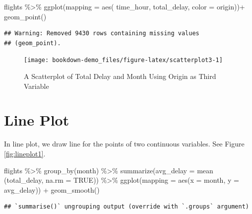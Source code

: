 \documentclass[
]{book}
\newenvironment{Shaded}{\begin{snugshade}}{\end{snugshade}}
\newcommand{\AttributeTok}[1]{\textcolor[rgb]{0.77,0.63,0.00}{#1}}
\newcommand{\ConstantTok}[1]{\textcolor[rgb]{0.00,0.00,0.00}{#1}}
\newcommand{\FunctionTok}[1]{\textcolor[rgb]{0.00,0.00,0.00}{#1}}
\newcommand{\NormalTok}[1]{#1}
\newcommand{\SpecialCharTok}[1]{\textcolor[rgb]{0.00,0.00,0.00}{#1}}
\begin{document}
\begin{Shaded}
\begin{Highlighting}[]
\NormalTok{flights }\SpecialCharTok{\%\textgreater{}\%} 
  \FunctionTok{ggplot}\NormalTok{(}\AttributeTok{mapping =} \FunctionTok{aes}\NormalTok{( time\_hour, total\_delay, }\AttributeTok{color =}\NormalTok{ origin))}\SpecialCharTok{+}
  \FunctionTok{geom\_point}\NormalTok{()}
\end{Highlighting}
\end{Shaded}

\begin{verbatim}
## Warning: Removed 9430 rows containing missing values
## (geom_point).
\end{verbatim}

\begin{figure}

{\centering \texttt{[image: bookdown-demo\_files/figure-latex/scatterplot3-1]} 

}

\caption{A Scatterplot of Total Delay and Month Using Origin as Third Variable}\label{fig:scatterplot3}
\end{figure}

\hypertarget{line-plot}{%
\section{Line Plot}\label{line-plot}}

In line plot, we draw line for the points of two continuous variables. See Figure \ref{fig:lineplot1}.

\begin{Shaded}
\begin{Highlighting}[]
\NormalTok{flights }\SpecialCharTok{\%\textgreater{}\%} 
  \FunctionTok{group\_by}\NormalTok{(month) }\SpecialCharTok{\%\textgreater{}\%} 
  \FunctionTok{summarize}\NormalTok{(}\AttributeTok{avg\_delay =} \FunctionTok{mean}\NormalTok{ (total\_delay, }\AttributeTok{na.rm =} \ConstantTok{TRUE}\NormalTok{)) }\SpecialCharTok{\%\textgreater{}\%}
  \FunctionTok{ggplot}\NormalTok{(}\AttributeTok{mapping =} \FunctionTok{aes}\NormalTok{(}\AttributeTok{x =}\NormalTok{ month, }\AttributeTok{y =}\NormalTok{ avg\_delay)) }\SpecialCharTok{+} 
  \FunctionTok{geom\_smooth}\NormalTok{()}
\end{Highlighting}
\end{Shaded}

\begin{verbatim}
## `summarise()` ungrouping output (override with `.groups` argument)
\end{verbatim}
\end{document}
